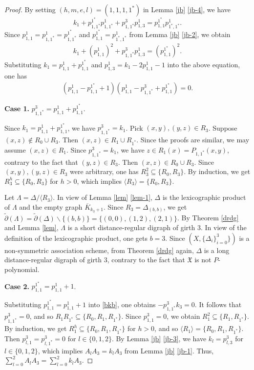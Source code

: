 \documentclass[12pt,a4paper]{amsart}
\theoremstyle{definition}
\begin{document}
\begin{proof}
By setting $(h,m,e,l)=(1,1,1,1^{*})$ in Lemma \ref{jb} \ref{jb-4}, we have
$$k_{1}+p_{1,1^{*}}^{1^{*}}p_{1,1^{*}}^{1}+p_{1,1^{*}}^{3}p_{1,3}^{1}=p_{1,1}^{1^{*}}p_{1^{*},1^{*}}^{1}.$$
Since $p_{1,1}^{1}=p_{1,1^{*}}^{1}=p_{1,1^{*}}^{1^{*}}$ and $p_{1,1}^{1^{*}}=p_{1^{*},1^{*}}^{1}$ from Lemma \ref{jb} \ref{jb-2}, we obtain
\begin{align}
k_{1}+(p_{1,1}^{1})^2+p_{1,1^{*}}^{3}p_{1,3}^{1}=(p_{1,1}^{1^{*}})^2.\nonumber
\end{align}
Substituting $k_1=p_{1,1}^1+p_{1,1}^{1^*}$ and $p_{1,3}^1=k_1-2p_{1,1}^1-1$ into the above equation, one has
\begin{align}
(p_{1,1}^{1}-p_{1,1}^{1^{*}}+1)(p_{1,1}^{1}-p_{1,1^{*}}^{3}+p_{1,1}^{1^{*}})=0.\nonumber
\end{align}

\textbf{Case 1.} $p_{1,1^{*}}^{3}=p_{1,1}^{1}+p_{1,1}^{1^{*}}$.

Since $k_1=p_{1,1}^{1}+ p_{1,1}^{1^*}$, we have $p_{1,1^{*}}^{3}=k_1$. Pick $(x,y),(y,z)\in R_3$. Suppose $(x,z)\notin R_0\cup R_3$. Then $(x,z)\in R_1\cup R_{1^*}$. Since the proofs are similar, we may assume $(x,z)\in R_1$. Since $p_{1,1^{*}}^{3}=k_1$, we have $z\in R_{1}(x)=P_{1,1^*}(x,y)$, contrary to the fact that $(y,z)\in R_3$. Then $(x,z)\in R_0\cup R_3$. Since $(x,y),(y,z)\in R_3$ were arbitrary, one has $R_3^2\subseteq\{R_0,R_3\}$. By induction, we get $R_3^h\subseteq\{R_0,R_3\}$ for $h>0$, which implies $\langle R_3\rangle =\{R_0,R_3\}$.

Let $\Lambda=\Delta/\langle R_3\rangle$. In view of Lemma \ref{lem} \ref{lem-1}, $\Delta$ is the lexicographic product of $\Lambda$ and the empty graph $\overline{K}_{k_3+1}$. Since $R_3=\Delta_{(b,b)}$, we get $\tilde{\partial}(\Lambda)=\tilde{\partial}(\Delta)\backslash\{(b,b)\}=\{(0,0),(1,2),(2,1)\}$. By Theorem \ref{drdg} and Lemma \ref{lem}, $\Lambda$ is a short distance-regular digraph of girth $3$. In view of the definition of the lexicographic product, one gets $b=3$. Since $(X,\{\Delta_i\}_{i=0}^3\})$ is a non-symmetric association scheme, from Theorem \ref{drdg} again, $\Delta$ is a long distance-regular digraph of girth $3$, contrary to the fact that $\mathfrak{X}$ is not $P$-polynomial.

\textbf{Case 2.} $p_{1,1}^{1^{*}}=p_{1,1}^{1}+1$.

Substituting $p_{1,1}^{1^{*}}=p_{1,1}^{1}+1$ into \eqref{bkb}, one obtains $-p_{1,1^{*}}^{3} k_3=0$. It follows that $p_{1,1^{*}}^{3}=0$, and so $R_1R_{1^*}\subseteq\{R_0,R_1,R_{1^*}\}$. Since $p_{1,1}^3=0$, we obtain $R_1^2\subseteq\{R_1,R_{1^*}\}$. By induction, we get $R_1^h\subseteq\{R_0,R_1,R_{1^*}\}$ for $h>0$, and so $\langle R_1\rangle=\{R_0,R_1,R_{1^*}\}$. Then $p_{l,1}^{3}=p_{l,1^{*}}^{3}=0$ for $l\in \{0,1,2\}$. By Lemma \ref{jb} \ref{jb-3}, we have $k_l=p_{l,3}^{3}$ for $l\in \{0,1,2\}$, which implies $A_lA_3=k_lA_3$ from Lemma \ref{jb} \ref{jb-1}. Thus, $\sum_{l=0}^{2}A_lA_3=\sum_{l=0}^{2}k_lA_3$.


\end{proof}
\end{document}
